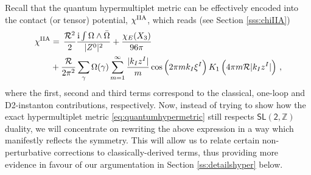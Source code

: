 Recall that the quantum hypermultiplet metric can be effectively encoded into the contact (or tensor) potential, $\chi^{\rm IIA}$, which reads (see Section \ref{sss:chiIIA})
%
\begin{align}\label{eq:apchiIIA}
	\chi^{\rm IIA} &=\, \frac{\mathcal{R}^2}{2} \frac{{\rm i} \int\Omega \wedge \bar \Omega }{|Z^0|^2} + \frac{\chi_{E}(X_3)}{96\pi} \notag\\
	&+ \frac{\mathcal{R}}{2\pi^2} \sum_{\gamma} \Omega (\gamma) \sum_{m=1}^{\infty} \frac{|k_I z^I|}{m} \cos \left( 2\pi m k_I \xi^I\right) K_1 \left( 4\pi m \mathcal{R}|k_I z^I|\right) \, ,
	\end{align}
%
where the first, second and third terms correspond to the classical, one-loop and D2-instanton contributions, respectively. Now, instead of trying to show how the exact hypermultiplet metric \eqref{eq:quantumhypermetric} still respects $\mathsf{SL(2,\mathbb{Z})}$ duality, we will concentrate on rewriting the above expression in a way which manifestly reflects the symmetry. This will allow us to relate certain non-perturbative corrections to classically-derived terms, thus providing more evidence in favour of our argumentation in Section \ref{ss:detailshyper} below. 
	
